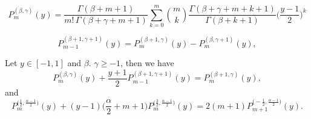 \documentclass[10pt,a4paper]{amsart}
\begin{document}
\begin{equation}
	\label{jacob}
	P_m^{(\beta, \gamma)}(y)= \frac{\Gamma(\beta+m+1)}{m! \, \Gamma(\beta+\gamma+m+1)} \sum_{k=0}^{m} \binom{m}{k} \frac{\Gamma(\beta+\gamma+m+k+1)}{\Gamma(\beta+k+1)} \bigg(\frac{y-1}{2}\bigg)^k
\end{equation}

\begin{equation}
	\label{recc}
	P^{(\beta+1, \gamma+1)}_{m-1}(y)=P^{(\beta+1, \gamma)}_{m}(y)-P^{(\beta, \gamma+1)}_{m}(y),
\end{equation}

\begin{proposition}
	Let $y \in [-1,1]$ and $\beta$. $\gamma \geq -1$, then we have
	\begin{equation}
		\label{relJ}
		P^{(\beta, \gamma)}_m(y)+\frac{y+1}{2}P^{(\beta+1, \gamma+1)}_{m-1}(y)=P^{(\beta+1, \gamma)}_m(y),
	\end{equation}
	and
	\begin{equation}
		\label{relJ3}
		P_m^{\big(\frac{1}{2}, \frac{\alpha-1}{2}\big)}(y)+(y-1)\Big(\frac{\alpha}{2}+m+1\Big)P_m^{\big(\frac{3}{2}, \frac{\alpha-1}{2}\big)}(y)=2(m+1) P_{m+1}^{\big(-\frac{1}{2}, \frac{\alpha-1}{2}\big)}(y).
	\end{equation}
\end{proposition}
\end{document}
